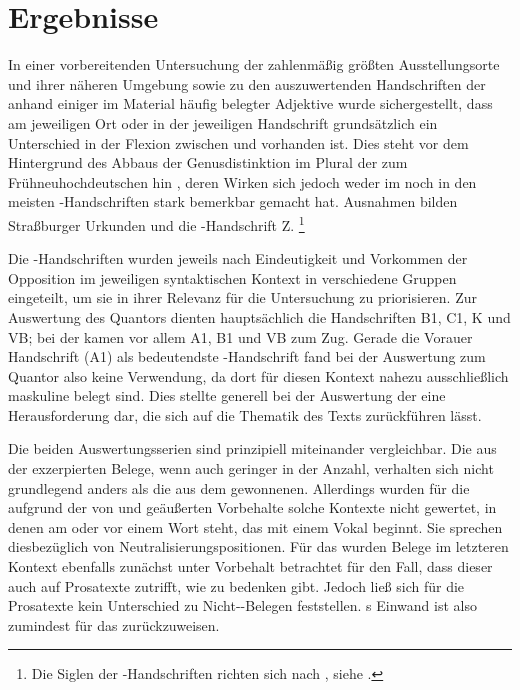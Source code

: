 \section{Ergebnisse}

In einer vorbereitenden Untersuchung der zahlenmäßig größten Ausstellungs\-orte
und ihrer näheren Umgebung sowie zu den auszuwertenden Handschriften der
\KC{} anhand einiger im Material häufig belegter Adjektive wurde
sichergestellt, dass am jeweiligen Ort oder in der jeweiligen Handschrift
grundsätzlich ein Unterschied in der Flexion zwischen  und
 vorhanden ist. Dies steht vor dem Hintergrund des Abbaus der
Genusdistinktion im Plural der
 zum Frühneuhochdeutschen hin
\autocite[191--192]{reichmannwegera1993}, deren Wirken sich jedoch weder im
\CAO{} noch in den meisten \KC-Handschriften stark bemerkbar gemacht hat.
Ausnahmen bilden Straßburger Urkunden und die \KC{}-Handschrift Z.%
%
	\footnote{Die Siglen der \KC-Handschriften richten sich nach
		, siehe .}

Die \KC{}-Handschriften wurden jeweils nach Eindeutigkeit und Vorkommen der
Opposition im jeweiligen syntaktischen Kontext in verschiedene Gruppen
eingeteilt, um sie in ihrer Relevanz für die Untersuchung zu priorisieren. Zur
Auswertung des Quantors   dienten hauptsächlich die
Handschriften B1, C1, K und VB; bei der   kamen
vor allem A1, B1 und VB zum Zug. Gerade die Vorauer Handschrift (A1) als
bedeutendste \KC{}-Handschrift fand bei der Auswertung zum Quantor 
also keine Verwendung, da dort für diesen Kontext nahezu ausschließlich
maskuline  belegt sind. Dies stellte generell bei der
Auswertung der \KC{} eine Herausforderung dar, die sich auf die Thematik des
Texts zurückführen lässt.

Die beiden Auswertungsserien sind prinzipiell miteinander vergleichbar. Die aus
der \KC{} exzerpierten Belege, wenn auch geringer in der Anzahl, verhalten sich
nicht grundlegend anders als die aus dem \CAO{} gewonnenen. Allerdings wurden
für die \KC{} aufgrund der von \citet[89--90]{askedal1973} und
\citet[191]{gjelsten1980} geäußerten Vorbehalte solche Kontexte
nicht gewertet, in denen  am  oder vor einem Wort
steht, das mit einem Vokal beginnt. Sie sprechen diesbezüglich von
Neutralisierungs\-positionen. Für das \CAO{} wurden Belege im letzteren Kontext
ebenfalls zunächst unter Vorbehalt betrachtet für den Fall, dass dieser auch
auf Prosatexte zutrifft, wie \citet[92]{askedal1973} zu bedenken
gibt. Jedoch ließ sich für die Prosatexte kein Unterschied zu
Nicht-\allowbreak{}-\allowbreak{}Belegen feststellen.
\citeauthor{askedal1973}s Einwand ist also zumindest für das \CAO{}
zurückzuweisen.

